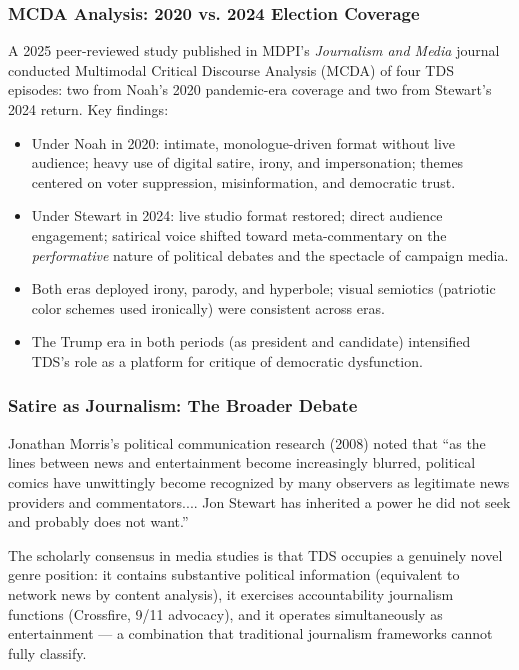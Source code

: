 \documentclass[11pt,letterpaper]{article}
\begin{document}
\subsubsection{MCDA Analysis: 2020 vs. 2024 Election Coverage}

A 2025 peer-reviewed study published in MDPI's \textit{Journalism and Media} journal conducted Multimodal Critical Discourse Analysis (MCDA) of four TDS episodes: two from Noah's 2020 pandemic-era coverage and two from Stewart's 2024 return. Key findings:

\begin{itemize}[leftmargin=*]
  \item Under Noah in 2020: intimate, monologue-driven format without live audience; heavy use of digital satire, irony, and impersonation; themes centered on voter suppression, misinformation, and democratic trust.
  \item Under Stewart in 2024: live studio format restored; direct audience engagement; satirical voice shifted toward meta-commentary on the \textit{performative} nature of political debates and the spectacle of campaign media.
  \item Both eras deployed irony, parody, and hyperbole; visual semiotics (patriotic color schemes used ironically) were consistent across eras.
  \item The Trump era in both periods (as president and candidate) intensified TDS's role as a platform for critique of democratic dysfunction.
\end{itemize}

\subsubsection{Satire as Journalism: The Broader Debate}

Jonathan Morris's political communication research (2008) noted that ``as the lines between news and entertainment become increasingly blurred, political comics have unwittingly become recognized by many observers as legitimate news providers and commentators.... Jon Stewart has inherited a power he did not seek and probably does not want.''

The scholarly consensus in media studies is that TDS occupies a genuinely novel genre position: it contains substantive political information (equivalent to network news by content analysis), it exercises accountability journalism functions (Crossfire, 9/11 advocacy), and it operates simultaneously as entertainment --- a combination that traditional journalism frameworks cannot fully classify.
\end{document}
